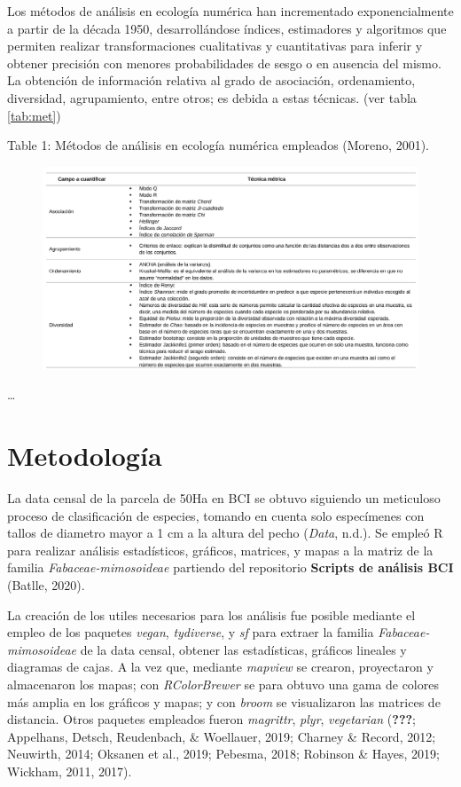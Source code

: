 \documentclass[11pt,]{article}
\begin{document}
Los métodos de análisis en ecología numérica han incrementado
exponencialmente a partir de la década 1950, desarrollándose índices,
estimadores y algoritmos que permiten realizar transformaciones
cualitativas y cuantitativas para inferir y obtener precisión con
menores probabilidades de sesgo o en ausencia del mismo. La obtención de
información relativa al grado de asociación, ordenamiento, diversidad,
agrupamiento, entre otros; es debida a estas técnicas. (ver tabla
\ref {tab:met})

Table 1: Métodos de análisis en ecología numérica empleados (Moreno,
2001).\label{tab:met}

\begin{figure}
\centering
\includegraphics[width=1.00000\textwidth]{Analisis/Diversidad/Tabla_Metodos_Analisis.png}
\caption{}
\end{figure}

\ldots

\section{Metodología}\label{metodologuxeda}

La data censal de la parcela de 50Ha en BCI se obtuvo siguiendo un
meticuloso proceso de clasificación de especies, tomando en cuenta solo
especímenes con tallos de diametro mayor a 1 cm a la altura del pecho
(\emph{Data}, n.d.). Se empleó R para realizar análisis estadísticos,
gráficos, matrices, y mapas a la matriz de la familia
\emph{Fabaceae-mimosoideae} partiendo del repositorio \textbf{Scripts de
análisis BCI} (Batlle, 2020).

La creación de los utiles necesarios para los análisis fue posible
mediante el empleo de los paquetes \emph{vegan}, \emph{tydiverse}, y
\emph{sf} para extraer la familia \emph{Fabaceae-mimosoideae} de la data
censal, obtener las estadísticas, gráficos lineales y diagramas de
cajas. A la vez que, mediante \emph{mapview} se crearon, proyectaron y
almacenaron los mapas; con \emph{RColorBrewer} se para obtuvo una gama
de colores más amplia en los gráficos y mapas; y con \emph{broom} se
visualizaron las matrices de distancia. Otros paquetes empleados fueron
\emph{magrittr}, \emph{plyr}, \emph{vegetarian} ({\textbf{???}};
Appelhans, Detsch, Reudenbach, \& Woellauer, 2019; Charney \& Record,
2012; Neuwirth, 2014; Oksanen et al., 2019; Pebesma, 2018; Robinson \&
Hayes, 2019; Wickham, 2011, 2017).
\end{document}
